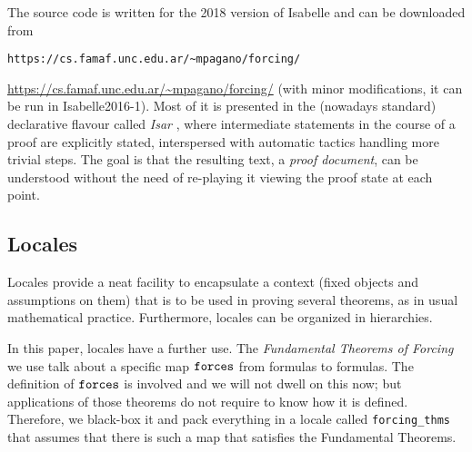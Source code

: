 The source code is written for the 2018 version of Isabelle and can be downloaded
from 
\ifIEEE
\begin{center}
\texttt{https://cs.famaf.unc.edu.ar/\~{}mpagano/forcing/}
\end{center}
\fi
\ifarXiv
\url{https://cs.famaf.unc.edu.ar/~mpagano/forcing/}
\fi
(with
minor modifications, it can be run in Isabelle2016-1). Most of it is
presented in the (nowadays standard) declarative flavour called
\emph{Isar} \cite{DBLP:conf/tphol/Wenzel99}, where intermediate
statements in the course of a proof are explicitly stated,
interspersed with automatic tactics handling more trivial steps. The
goal is that the resulting text, a \emph{proof document}, can be
understood without the need of re-playing it viewing the proof state
at each point.

\subsection{Locales}
\label{sec:locales}
Locales \cite{ballarin2010tutorial} provide a neat facility to
encapsulate a context (fixed objects and assumptions on them) that is
to be used in proving several theorems, as in usual mathematical
practice. Furthermore, locales can be organized in hierarchies. 

In this paper, locales have a further use. The \emph{Fundamental
  Theorems of Forcing} we use talk about a specific map $\mathop{\mathtt{forces}}$
from formulas to formulas. The definition of $\mathop{\mathtt{forces}}$ is involved
and we will not dwell on this now; but applications of those theorems
do not require to know how it is defined. Therefore, we black-box it
and pack everything in a locale called \texttt{forcing\_thms} that
assumes that there is such a 
map that satisfies the Fundamental Theorems.



